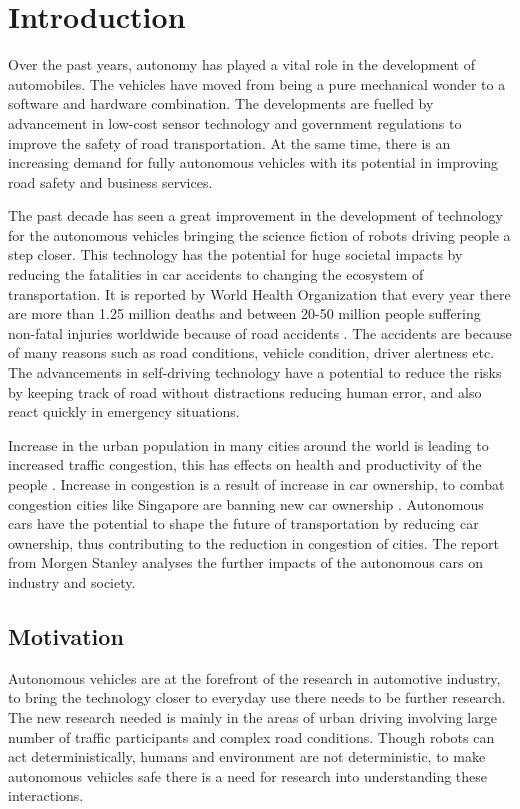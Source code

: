 \chapter{Introduction}
\label{introduction}

Over the past years, autonomy has played a vital role in the development of automobiles. The vehicles have moved from being a pure mechanical wonder to a software and hardware combination. The developments are fuelled by advancement in low-cost sensor technology and government regulations to improve the safety of road transportation. At the same time, there is an increasing demand for fully autonomous vehicles with its potential in improving road safety and business services.

The past decade has seen a great improvement in the development of technology for the autonomous vehicles bringing the science fiction of robots driving people a step closer. This technology has the potential for huge societal impacts by reducing the fatalities in car accidents to changing the ecosystem of transportation. It is reported by World Health Organization that every year there are more than 1.25 million deaths and between 20-50 million people suffering non-fatal injuries worldwide because of road accidents \cite{whoaccidents}. The accidents are because of many reasons such as road conditions, vehicle condition, driver alertness etc. The advancements in self-driving technology have a potential to reduce the risks by keeping track of road without distractions reducing human error, and also react quickly in emergency situations.

Increase in the urban population in many cities around the world is leading to increased traffic congestion, this has effects on health and productivity of the people \cite{citycongestion}. Increase in congestion is a result of increase in car ownership, to combat congestion cities like Singapore are banning new car ownership \cite{singaporebanscars}. Autonomous cars have the potential to shape the future of transportation by reducing car ownership, thus contributing to the reduction in congestion of cities. The report \cite{morgenstanleyreport} from Morgen Stanley analyses the further impacts of the autonomous cars on industry and society. 


\section{Motivation}

Autonomous vehicles are at the forefront of the research in automotive industry, to bring the technology closer to everyday use there needs to be further research. The new research needed is mainly in the areas of urban driving involving large number of traffic participants and complex road conditions. Though robots can act deterministically, humans and environment are not deterministic, to make autonomous vehicles safe there is a need for research into understanding these interactions.

